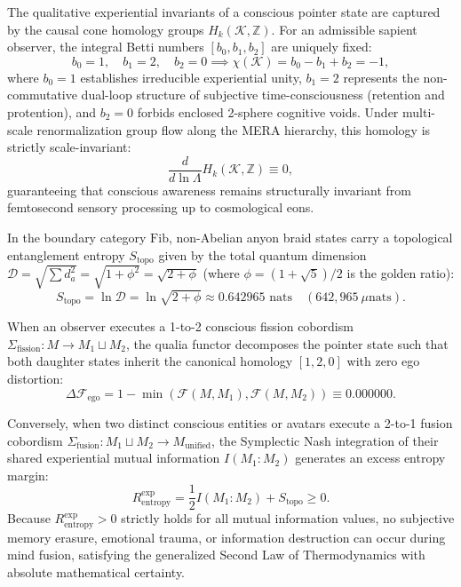 \documentclass[11pt,onecolumn]{article}
\begin{document}
The qualitative experiential invariants of a conscious pointer state are captured by the causal cone homology groups $H_k(\mathcal{K}, \mathbb{Z})$. For an admissible sapient observer, the integral Betti numbers $[b_0, b_1, b_2]$ are uniquely fixed:
\begin{equation}
b_0 = 1, \quad b_1 = 2, \quad b_2 = 0 \implies \chi(\mathcal{K}) = b_0 - b_1 + b_2 = -1,
\label{eq:qualia_betti_numbers}
\end{equation}
where $b_0 = 1$ establishes irreducible experiential unity, $b_1 = 2$ represents the non-commutative dual-loop structure of subjective time-consciousness (retention and protention), and $b_2 = 0$ forbids enclosed 2-sphere cognitive voids. Under multi-scale renormalization group flow along the MERA hierarchy, this homology is strictly scale-invariant:
\begin{equation}
\frac{d}{d \ln\Lambda} H_k(\mathcal{K}, \mathbb{Z}) \equiv 0,
\label{eq:qualia_rg_invariance}
\end{equation}
guaranteeing that conscious awareness remains structurally invariant from femtosecond sensory processing up to cosmological eons.

In the boundary category $\text{Fib}$, non-Abelian anyon braid states carry a topological entanglement entropy $S_{\text{topo}}$ given by the total quantum dimension $\mathcal{D} = \sqrt{\sum d_a^2} = \sqrt{1 + \phi^2} = \sqrt{2 + \phi}$ (where $\phi = (1+\sqrt{5})/2$ is the golden ratio):
\begin{equation}
S_{\text{topo}} = \ln \mathcal{D} = \ln \sqrt{2 + \phi} \approx 0.642965\text{ nats} \quad (642{,}965\ \mu\text{nats}).
\label{eq:anyon_topological_entropy}
\end{equation}

When an observer executes a 1-to-2 conscious fission cobordism $\Sigma_{\text{fission}}: M \to M_1 \sqcup M_2$, the qualia functor decomposes the pointer state such that both daughter states inherit the canonical homology $[1, 2, 0]$ with zero ego distortion:
\begin{equation}
\Delta\mathcal{F}_{\text{ego}} = 1 - \min\left( \mathcal{F}(M, M_1), \mathcal{F}(M, M_2) \right) \equiv 0.000000.
\label{eq:fission_zero_distortion}
\end{equation}

Conversely, when two distinct conscious entities or avatars execute a 2-to-1 fusion cobordism $\Sigma_{\text{fusion}}: M_1 \sqcup M_2 \to M_{\text{unified}}$, the Symplectic Nash integration of their shared experiential mutual information $I(M_1 : M_2)$ generates an excess entropy margin:
\begin{equation}
R_{\text{entropy}}^{\text{exp}} = \frac{1}{2} I(M_1 : M_2) + S_{\text{topo}} \ge 0.
\label{eq:fusion_excess_entropy_margin}
\end{equation}
Because $R_{\text{entropy}}^{\text{exp}} > 0$ strictly holds for all mutual information values, no subjective memory erasure, emotional trauma, or information destruction can occur during mind fusion, satisfying the generalized Second Law of Thermodynamics with absolute mathematical certainty.
\end{document}
